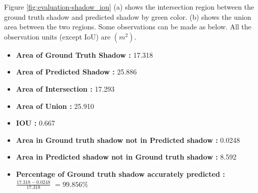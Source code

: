 Figure \ref{fig:evaluation-shadow_iou} (a) shows the intersection region between the ground truth shadow and predicted shadow by green color. (b) shows the union area between the two regions. Some observations can be made as below. All the observation units (except IoU) are \((m^2)\).
\begin{itemize}
    \item \textbf{Area of Ground Truth Shadow : }17.318
    \item \textbf{Area of Predicted Shadow : }25.886
    \item \textbf{Area of Intersection : }17.293
    \item \textbf{Area of Union : }25.910
    \item \textbf{IOU : }0.667
    \item \textbf{Area in Ground truth shadow not in Predicted shadow : }0.0248
    \item \textbf{Area in Predicted shadow not in Ground truth shadow : }8.592
    \item \textbf{Percentage of Ground truth shadow accurately predicted :} $\frac{17.318 - 0.0248}{17.318}$ \( = 99.856\%\) 
\end{itemize}



